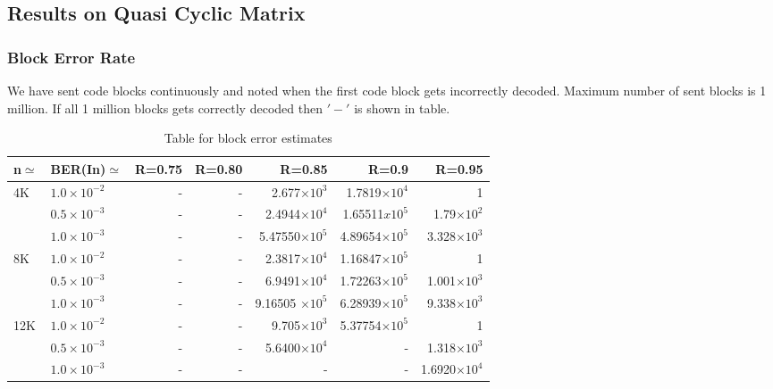 \subsection{Results on Quasi Cyclic Matrix}
\subsubsection{Block Error Rate }

We have sent code blocks continuously and noted when the first code block gets incorrectly decoded. Maximum number of sent blocks is 1 million. If all 1 million blocks gets correctly decoded then $'-'$ is shown in table.

\begin{table}[H]
\centering
\caption[Table for block error estimates of Min Sum decode using quasi cyclic matrix]{ Table for block error estimates  }
\begin{tabular}{|l|l|r|r|r|r|r|}
\hline
n$\simeq$   & BER(In)$\simeq$    & R=0.75  & R=0.80  & R=0.85  & R=0.9 & R=0.95 \\ \hline
4K  & $1.0\times10^{-2}$  & -    & - &2.677$\times10^{3}$           &1.7819$\times10^{4}$       &1       \\ 
    & $0.5\times10^{-3}$  &-     & - &2.4944$\times10^{4}$          &1.65511$x10^{5}$		&1.79$\times10^{2}$   \\ 
    & $1.0\times10^{-3}$  & -   & -  &5.47550$\times10^{5}$         &4.89654$\times10^{5}$     &3.328$\times10^{3}$ \\ \hline
8K  & $1.0\times10^{-2}$   & -   & - &2.3817$\times10^{4}$          &1.16847$\times10^{5}$        &1   \\ 
    & $0.5\times10^{-3}$   & -     & -&6.9491$\times10^{4}$          &1.72263$\times10^{5}$       &1.001$\times10^{3}$  \\ 
    & $1.0\times10^{-3}$   & -   & -  &9.16505 $\times10^{5}$        &6.28939$\times10^{5}$       &9.338$\times10^{3}$  \\ \hline
12K & $1.0\times10^{-2}$   & -   & -  &9.705$\times10^{3}$          &5.37754$\times10^{5}$       	&1       \\
    & $0.5\times10^{-3}$   & -     & -&5.6400$\times10^{4}$          &-     			 		&1.318$\times10^{3}$  \\ 
    & $1.0\times10^{-3}$   & - & - &- 			             &-    					 &1.6920$\times10^{4}$   \\ \hline 
\end{tabular}
\label{tab:nameForThisTable}
\end{table}

